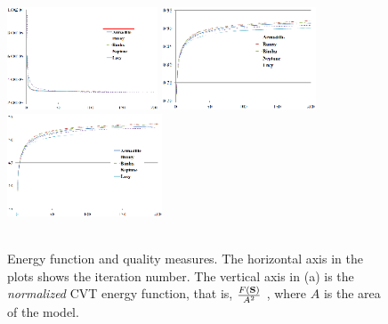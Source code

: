 \begin{figure}[htbp] \centering
\centering
\includegraphics[height=1.2in]{figs/cvt/energy_200.png}
\includegraphics[height=1.2in]{figs/cvt/quality_2.png}
\includegraphics[height=1.2in]{figs/cvt/angle.png}\\
\\
\caption{Energy function and quality measures. The horizontal axis in the plots shows the iteration number. The vertical axis in (a) is the \textit{normalized} CVT energy function, that is, $\frac{F({\bf S})}{A^2}$
, where $A$ is the area of the model.}
  \label{fig:convergence}
\end{figure}


